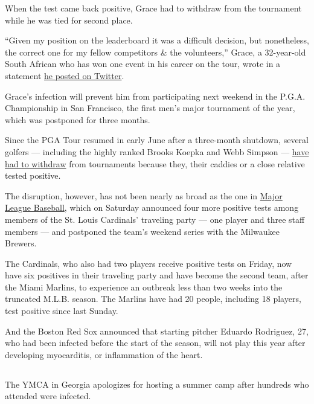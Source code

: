When the test came back positive, Grace had to withdraw from the
tournament while he was tied for second place.

``Given my position on the leaderboard it was a difficult decision, but
nonetheless, the correct one for my fellow competitors \& the
volunteers,'' Grace, a 32-year-old South African who has won one event
in his career on the tour, wrote in a statement
\href{https://twitter.com/BrandenGrace/status/1289689928180404230?s=20}{he
posted on Twitter}.

Grace's infection will prevent him from participating next weekend in
the P.G.A. Championship in San Francisco, the first men's major
tournament of the year, which was postponed for three months.

Since the PGA Tour resumed in early June after a three-month shutdown,
several golfers --- including the highly ranked Brooks Koepka and Webb
Simpson ---
\href{https://www.nytimes.com/2020/06/26/sports/golf/pga-golfer-positive-tests.html}{have
had to withdraw} from tournaments because they, their caddies or a close
relative tested positive.

The disruption, however, has not been nearly as broad as the one in
\href{https://www.nytimes.com/2020/08/01/sports/baseball/coronavirus-cardinals.html}{Major
League Baseball}, which on Saturday announced four more positive tests
among members of the St. Louis Cardinals' traveling party --- one player
and three staff members --- and postponed the team's weekend series with
the Milwaukee Brewers.

The Cardinals, who also had two players receive positive tests on
Friday, now have six positives in their traveling party and have become
the second team, after the Miami Marlins, to experience an outbreak less
than two weeks into the truncated M.L.B. season. The Marlins have had 20
people, including 18 players, test positive since last Sunday.

And the Boston Red Sox announced that starting pitcher Eduardo
Rodriguez, 27, who had been infected before the start of the season,
will not play this year after developing myocarditis, or inflammation of
the heart.

\hypertarget{-7}{%
\subsection{}\label{-7}}

The YMCA in Georgia apologizes for hosting a summer camp after hundreds
who attended were infected.

